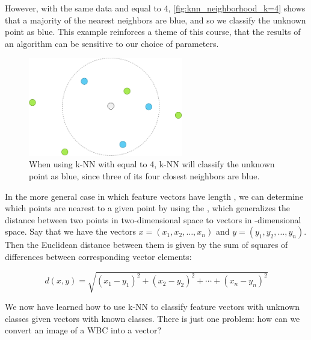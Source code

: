 However, with the same data and  equal to 4, \autoref{fig:knn_neighborhood_k=4} shows that a majority of the  nearest neighbors are blue, and so we classify the unknown point as blue. This example reinforces a theme of this course, that the results of an algorithm can be sensitive to our choice of parameters.\\

\begin{figure}[h]
\centering
\mySfFamily
\includegraphics[width = 0.6\textwidth]{../images/knn_neighborhood_k=4.png}
\caption{When using k-NN with  equal to 4, k-NN will classify the unknown point as blue, since three of its four closest neighbors are blue.}
\label{fig:knn_neighborhood_k=4}
\end{figure}

\begin{qbox}[%
When \textvar{k} = 2 or \textvar{k} = 6 for the classification of the point in \autoref{fig:knn_neighborhood}, note that we obtain a tie in the number of points from each known class belonging to the \textvar{k} nearest neighbors of a point with unknown class. How could we break ties in k-NN?
]\end{qbox}

In the more general case in which feature vectors have length , we can determine which points are nearest to a given point by using the , which generalizes the distance between two points in two-dimensional space to vectors in -dimensional space. Say that we have the vectors $x = (x_1, x_2, \ldots, x_n)$ and $y = (y_1, y_2, \ldots, y_n)$. Then the Euclidean distance between them is given by the sum of squares of differences between corresponding vector elements:

$$d(x, y) = \sqrt{(x_1 - y_1)^2 + (x_2 - y_2)^2 + \cdots + (x_n-y_n)^2}$$

We now have learned how to use k-NN to classify feature vectors with unknown classes given vectors with known classes. There is just one problem: how can we convert an image of a WBC into a vector?

